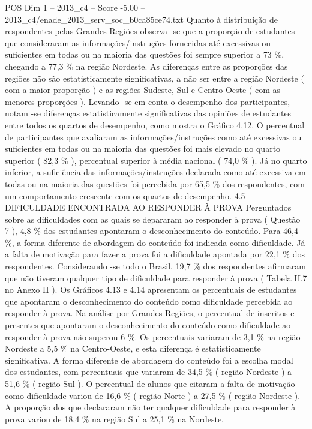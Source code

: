\begin{textsample}{POS Dim 1 – 2013\_c4 – Score -5.00 – 2013\_c4/enade\_2013\_serv\_soc\_b0ca85ce74.txt}
Quanto à distribuição de respondentes pelas Grandes Regiões observa -se que a proporção de estudantes que consideraram as informações/instruções fornecidas até excessivas ou suficientes em todas ou na maioria das questões foi sempre superior a 73 \%, chegando a 77,3 \% na região Nordeste.
As diferenças entre as proporções das regiões não são estatisticamente significativas, a não ser entre a região Nordeste ( com a maior proporção ) e as regiões Sudeste, Sul e Centro-Oeste ( com as menores proporções ).
Levando -se em conta o desempenho dos participantes, notam -se diferenças estatisticamente significativas das opiniões de estudantes entre todos os quartos de desempenho, como mostra o Gráfico 4.12.
O percentual de participantes que avaliaram as informações/instruções como até excessivas ou suficientes em todas ou na maioria das questões foi mais elevado no quarto superior ( 82,3 \% ), percentual superior à média nacional ( 74,0 \% ).
Já no quarto inferior, a suficiência das informações/instruções declarada como até excessiva em todas ou na maioria das questões foi percebida por 65,5 \% dos respondentes, com um comportamento crescente com os quartos de desempenho. 4.5 DIFICULDADE ENCONTRADA AO RESPONDER À PROVA Perguntados sobre as dificuldades com as quais se depararam ao responder à prova ( Questão 7 ), 4,8 \% dos estudantes apontaram o desconhecimento do conteúdo.
Para 46,4 \%, a forma diferente de abordagem do conteúdo foi indicada como dificuldade.
Já a falta de motivação para fazer a prova foi a dificuldade apontada por 22,1 \% dos respondentes.
Considerando -se todo o Brasil, 19,7 \% dos respondentes afirmaram que não tiveram qualquer tipo de dificuldade para responder à prova ( Tabela II.7 no Anexo II ).
Os Gráficos 4.13 e 4.14 apresentam os percentuais de estudantes que apontaram o desconhecimento do conteúdo como dificuldade percebida ao responder à prova.
Na análise por Grandes Regiões, o percentual de inscritos e presentes que apontaram o desconhecimento do conteúdo como dificuldade ao responder à prova não superou 6 \%.
Os percentuais variaram de 3,1 \% na região Nordeste a 5,5 \% na Centro-Oeste, e esta diferença é estatisticamente significativa.
A forma diferente de abordagem do conteúdo foi a escolha modal dos estudantes, com percentuais que variaram de 34,5 \% ( região Nordeste ) a 51,6 \% ( região Sul ).
O percentual de alunos que citaram a falta de motivação como dificuldade variou de 16,6 \% ( região Norte ) a 27,5 \% ( região Nordeste ).
A proporção dos que declararam não ter qualquer dificuldade para responder à prova variou de 18,4 \% na região Sul a 25,1 \% na Nordeste.

\end{textsample}
